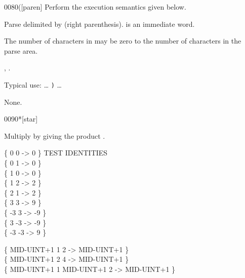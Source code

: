 \begin{worddef}[p]{0080}{(}[paren]
\compile
	Perform the execution semantics given below.

\execute

	Parse  delimited by  (right parenthesis).
	 is an immediate word.

	The number of characters in  may be zero to the
	number of characters in the parse area.

\see {},
	.

	\begin{defer}
	\rationale %
		Typical use: {\ldots}  \texttt{)} {\ldots}

	\testing \textrm{None.}
	\end{defer}
\end{worddef}


\begin{worddef}{0090}{*}[star]
\item {}

	Multiply  by  giving the product
	\param{n_3|u_3}.

	\begin{defer}
	\testing
		\{  0  0 \word{*} ->  0 \} \tab[4]  TEST IDENTITIE{\bs}S \\
		\{  0  1 \word{*} ->  0 \} \\
		\{  1  0 \word{*} ->  0 \} \\
		\{  1  2 \word{*} ->  2 \} \\
		\{  2  1 \word{*} ->  2 \} \\
		\{  3  3 \word{*} ->  9 \} \\
		\{ -3  3 \word{*} -> -9 \} \\
		\{  3 -3 \word{*} -> -9 \} \\
		\{ -3 -3 \word{*} ->  9 \}

		\{ MID-UINT+1 1  2 \word{*} -> MID-UINT+1 \} \\
		\{ MID-UINT+1 2  4 \word{*} -> MID-UINT+1 \} \\
		\{ MID-UINT+1 1  MID-UINT+1  2 \word{*} -> MID-UINT+1 \} \\
	\end{defer}
\end{worddef}


